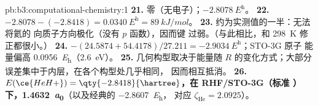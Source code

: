 \begin{solution}{pb:b3:computational-chemistry:1}
\textbf{21.} 零（无电子）；$\qty{-2.8078}{\hartree}$。
\textbf{22.} $-2.8078 - (-2.8418) = \qty{0.0340}{\hartree} = \qty{89}{kJ/mol}$。
\textbf{23.} 约为实测值的一半：无法将氦的
向质子方向极化（没有 $p$ 函数），因而键
过弱。（与此相比，和 \qty{298}{K} 修正都很小。）
\textbf{24.} $-(24.5874 + 54.4178)/27.211 = \qty{-2.9034}{\hartree}$；STO-3G 原子
能量偏高 \qty{0.0956}{\hartree}（\qty{2.6}{eV}）。
\textbf{25.} 几何构型取决于能量随 $R$ 的变化方式；大部分
误差集中于内层，在各个构型处几乎相同，
因而相互抵消。
\textbf{26.} \textbf{$E(\ce{HeH+}) = \qty{-2.8418}{\hartree}$，在 RHF/STO-3G（标准
）下，\qty{1.4632}{\bohr}}（以及经典的 \qty{-2.8607}{\hartree}，
对应 $\zeta_{\mathrm{He}} = 2.0925$）。
\end{solution}
